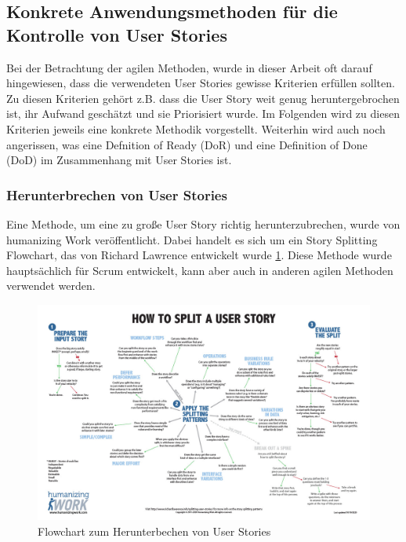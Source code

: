 \documentclass[acmtog]{acmart}
\begin{document}
\subsection{Konkrete Anwendungsmethoden für die Kontrolle von User Stories}

Bei der Betrachtung der agilen Methoden, wurde in dieser Arbeit oft darauf hingewiesen, dass die verwendeten User Stories gewisse Kriterien 
erfüllen sollten. Zu diesen Kriterien gehört z.B. dass die User Story weit genug heruntergebrochen ist, ihr Aufwand geschätzt und sie Priorisiert 
wurde. Im Folgenden wird zu diesen Kriterien jeweils eine konkrete Methodik vorgestellt. Weiterhin wird auch noch angerissen, was eine Defnition of 
Ready (DoR) und eine Definition of Done (DoD) im Zusammenhang mit User Stories ist.

\subsubsection{Herunterbrechen von User Stories} \label{sec:breakedown}

Eine Methode, um eine zu große User Story richtig herunterzubrechen, wurde von humanizing Work veröffentlicht. Dabei handelt es sich um ein Story 
Splitting Flowchart, das von Richard Lawrence entwickelt wurde \ref{fig:breakedownt}. Diese Methode wurde hauptsächlich für Scrum entwickelt, kann aber auch 
in anderen agilen Methoden verwendet werden. \cite{humanizingwork}

\begin{figure}[t]
  \centering
  \includegraphics[width=\linewidth]{images/HW-Story-Splitting-Flowchart-Thumbnail.jpg}
  \caption{Flowchart zum Herunterbechen von User Stories \cite{humanizingwork}}
    \label{fig:breakedownt}
  \Description{}
\end{figure}
\end{document}
